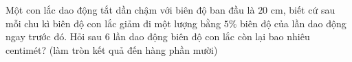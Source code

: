 \begin{ex}
Một con lắc dao động tắt dần chậm với biên độ ban đầu là $20$ cm, biết cứ sau mỗi chu kì biên độ con lắc giảm đi một lượng bằng $5\%$ biên độ của lần dao động ngay trước đó. Hỏi sau $6$ lần dao động biên độ con lắc còn lại bao nhiêu centimét? (làm tròn kết quả đến hàng phần mười)
\end{ex}
